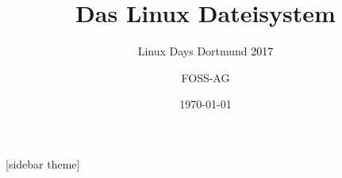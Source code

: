 \documentclass{beamer}
\author{FOSS-AG}
\date{\today}
\title{Das Linux Dateisystem}
\subtitle{Linux Days Dortmund \textcolor{black}{2017}}
\begin{document}
\begin{frame}
    \titlepage
\end{frame}



[sidebar theme]

\makeatother
%



%









%



%













\end{document}

